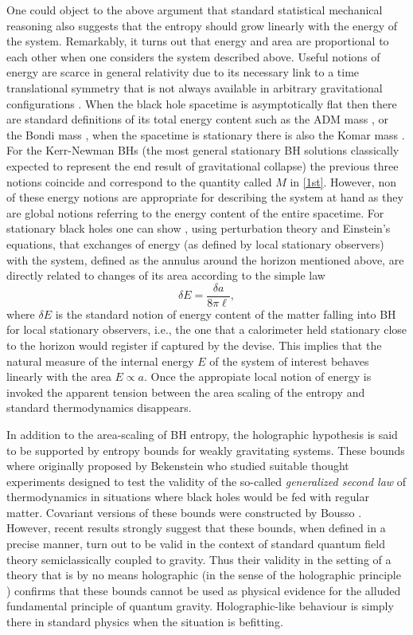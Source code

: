 \documentclass[aps, nofootinbib,superscriptaddress,12pt]{revtex4-2}
\def\be{\begin{equation}}
\def\ee{\end{equation}}
\begin{document}
One could object to the above argument that standard statistical mechanical reasoning also suggests that the entropy should grow linearly with the energy of the system. Remarkably, it turns out that energy and area are proportional to each other when one considers the system described above. Useful notions of energy are scarce in general relativity due to its necessary link to a time translational symmetry that is not always available in arbitrary gravitational configurations \cite{Szabados:2009eka}. When the black hole spacetime is asymptotically flat then there are standard definitions of its total energy content such as the ADM mass \cite{Arnowitt:1959ah}, or the Bondi mass \cite{Bondi:1962px}, when the spacetime is stationary there is also the Komar mass \cite{Komar:1958wp}. For the Kerr-Newman BHs (the most general stationary BH solutions classically expected to represent the end result of gravitational collapse) the previous three notions coincide and correspond to the quantity called $M$ in \eqref{1st}. However, non of these energy notions are appropriate for describing the system at hand as they are global notions referring to the energy content of the entire spacetime.  For stationary black holes one can  show \cite{Frodden:2011eb}, using perturbation theory and Einstein's equations, that exchanges of energy (as defined by local stationary observers) with the system, defined as the 
annulus around the horizon mentioned above, are directly related to changes of its area according to the simple law
\be
\delta E=\frac{\delta a}{8\pi\ell},
\ee
where $\delta E$ is the standard notion of energy content of the matter falling into BH for local stationary observers, i.e., the one that a calorimeter held stationary close to the horizon would register if captured by the devise. This implies that the natural measure of the internal energy $E$ of the system of interest behaves linearly with the area $E\propto a$. Once the appropiate local notion of energy is invoked the apparent tension between the area scaling of the entropy and standard thermodynamics 
disappears. 

In addition to the area-scaling of BH entropy, the holographic hypothesis is said to be supported by entropy bounds
for weakly gravitating systems. These bounds where originally proposed by Bekenstein \cite{Bekenstein:1980jp} who studied suitable thought experiments designed to test the validity of the so-called {\em generalized second law} \cite{Bekenstein:1974ax} of thermodynamics in situations where black holes would be fed with regular matter.  Covariant versions of these bounds were constructed by Bousso \cite{Bousso:1999xy}. However, recent results \cite{Casini:2008cr, Bousso:2014sda} strongly suggest that these bounds, when defined 
in a precise manner, turn out to be valid in the context of standard quantum field theory semiclassically coupled to gravity. Thus their validity in the
setting of a theory that is by no means holographic (in the sense of the holographic principle \cite{Bousso:2002ju}) confirms that these bounds cannot be used as physical evidence for the alluded fundamental principle of quantum gravity.
Holographic-like behaviour is simply there in standard physics when the situation is befitting.  
\end{document}
